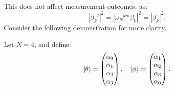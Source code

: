 This does not affect measurement outcomes, as:
\[
    |\beta_k'|^2 = |\omega_N^{-km} \beta_k|^2 = |\beta_k|^2.
\]
Consider the following demonstration for more clarity.
\begin{example}
Let \( N = 4 \), and define:
\[
\ket{\theta} = 
\begin{pmatrix}
    \alpha_0 \\
    \alpha_1 \\
    \alpha_2 \\
    \alpha_3
\end{pmatrix}, \quad
\ket{\phi} = 
\begin{pmatrix}
    \alpha_1 \\
    \alpha_2 \\
    \alpha_3 \\
    \alpha_0
\end{pmatrix}.
\]


\end{example}
